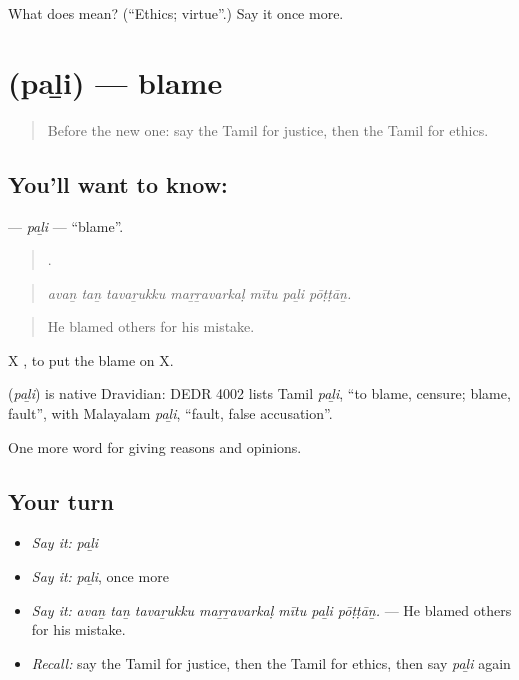 \begin{tcolorbox}[breakable,colback=teal!4,colframe=teal!35!black,title={Before you move on}]
What does  mean? (\textquotedblleft{}Ethics; virtue\textquotedblright{}.) Say it once more.
\end{tcolorbox}
\section[\texorpdfstring{\ta{பழி} (paḻi)}{பழி (paḻi)}]{ (paḻi) — blame}

\label{lesson:TA-C360-pali}



\begin{quote}
Before the new one: say the Tamil for justice, then the Tamil for ethics.
\end{quote}

\subsection*{You'll want to know: }
\textbf{} — \emph{paḻi} — \textquotedblleft{}blame\textquotedblright{}.

\begin{quote}
      .
\end{quote}

\begin{quote}
\emph{avaṉ taṉ tavaṟukku maṟṟavarkaḷ mītu paḻi pōṭṭāṉ.}
\end{quote}

\begin{quote}
He blamed others for his mistake.
\end{quote}

X   , to put the blame on X.

\begin{cousinweb}
\textbf{} (\emph{paḻi}) is native Dravidian: DEDR 4002 lists Tamil \emph{paḻi}, \textquotedblleft{}to blame, censure; blame, fault\textquotedblright{}, with Malayalam \emph{paḻi}, \textquotedblleft{}fault, false accusation\textquotedblright{}.
\end{cousinweb}

\begin{grammarlens}[title={What you've built}]
One more word for giving reasons and opinions.
\end{grammarlens}

\subsection*{Your turn}
\begin{itemize}
\raggedright
  \item \emph{Say it:} \emph{paḻi}
  \item \emph{Say it:} \emph{paḻi}, once more
  \item \emph{Say it:} \emph{avaṉ taṉ tavaṟukku maṟṟavarkaḷ mītu paḻi pōṭṭāṉ.} — He blamed others for his mistake.
  \item \emph{Recall:} say the Tamil for justice, then the Tamil for ethics, then say \emph{paḻi} again
\end{itemize}

